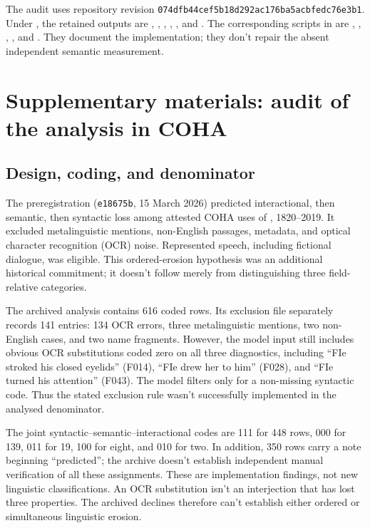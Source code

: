 \documentclass[12pt]{article}
\begin{document}
The audit uses repository revision \texttt{074dfb44cef5b18d292ac176ba5acbfedc76e3b1}. Under , the retained outputs are , , , , , and . The corresponding scripts in  are , , , , and . They document the implementation; they don't repair the absent independent semantic measurement.

\clearpage

\section[Fie in COHA]{Supplementary materials: audit of the  analysis in COHA}
\label{app:fie}

\subsection{Design, coding, and denominator}

The preregistration (\texttt{e18675b}, 15 March 2026) predicted interactional, then semantic, then syntactic loss among attested COHA uses of , 1820--2019. It excluded metalinguistic mentions, non-English passages, metadata, and optical character recognition (OCR) noise. Represented speech, including fictional dialogue, was eligible. This ordered-erosion hypothesis was an additional historical commitment; it doesn't follow merely from distinguishing three field-relative categories.

The archived analysis contains 616 coded rows. Its exclusion file separately records 141 entries: 134 OCR errors, three metalinguistic mentions, two non-English cases, and two name fragments. However, the model input still includes obvious OCR substitutions coded zero on all three diagnostics, including \enquote{FIe stroked his closed eyelids} (F014), \enquote{FIe drew her to him} (F028), and \enquote{FIe turned his attention} (F043). The model filters only for a non-missing syntactic code. Thus the stated exclusion rule wasn't successfully implemented in the analysed denominator.

The joint syntactic--semantic--interactional codes are 111 for 448 rows, 000 for 139, 011 for 19, 100 for eight, and 010 for two. In addition, 350 rows carry a note beginning \enquote{predicted}; the archive doesn't establish independent manual verification of all these assignments. These are implementation findings, not new linguistic classifications. An OCR substitution isn't an interjection that has lost three properties. The archived declines therefore can't establish either ordered or simultaneous linguistic erosion.
\end{document}
